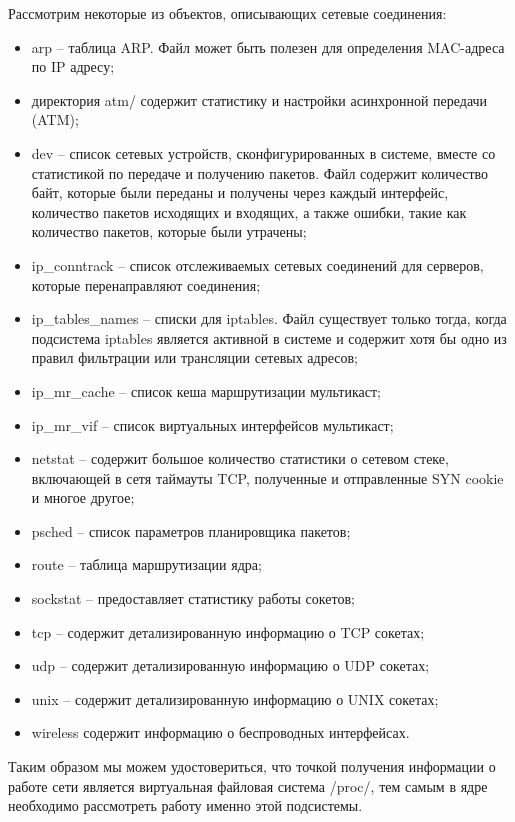 \documentclass{gost7.32-2001}
\begin{document}
Рассмотрим некоторые из объектов, описывающих сетевые соединения:
\begin{itemize}
\item
  arp – таблица ARP. Файл может быть полезен для определения
  MAC-адреса по IP адресу;
\item
  директория atm/ содержит статистику и настройки асинхронной передачи
  (ATM);
\item
  dev – список сетевых устройств, сконфигурированных в системе, вместе
  со статистикой по передаче и получению пакетов. Файл содержит
  количество байт, которые были переданы и получены через каждый
  интерфейс, количество пакетов исходящих и входящих, а также ошибки,
  такие как количество пакетов, которые были утрачены;
\item
  ip\_conntrack – список отслеживаемых сетевых соединений для
  серверов, которые перенаправляют соединения;
\item
  ip\_tables\_names – списки для iptables. Файл существует только
  тогда, когда подсистема iptables является активной в системе и
  содержит хотя бы одно из правил фильтрации или трансляции сетевых
  адресов;
\item
  ip\_mr\_cache – список кеша маршрутизации мультикаст;
\item
  ip\_mr\_vif – список виртуальных интерфейсов мультикаст;
\item
  netstat – содержит большое количество статистики о сетевом стеке,
  включающей в сетя таймауты TCP, полученные и отправленные SYN cookie
  и многое другое;
\item
  psched – список параметров планировщика пакетов;
\item
  route – таблица маршрутизации ядра;
\item
  sockstat – предоставляет статистику работы сокетов;
\item
  tcp – содержит детализированную информацию о TCP сокетах;
\item
  udp – содержит детализированную информацию о UDP сокетах;
\item
  unix – содержит детализированную информацию о UNIX сокетах;
\item
  wireless содержит информацию о беспроводных интерфейсах.
\end{itemize}

Таким образом мы можем удостовериться, что точкой получения информации
о работе сети является виртуальная файловая система /proc/, тем самым
в ядре необходимо рассмотреть работу именно этой подсистемы.
\end{document}
